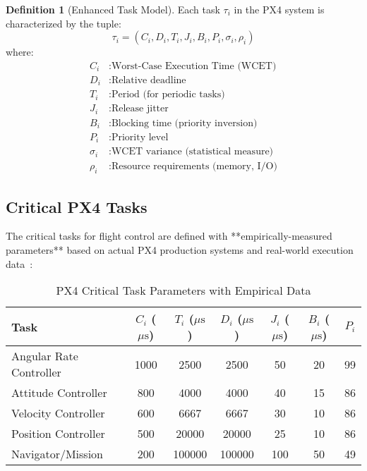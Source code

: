 \documentclass[11pt,a4paper]{article}
\newcommand{\mus}{\ensuremath{\mu\text{s}}}
\theoremstyle{definition}
\newtheorem{definition}[theorem]{Definition}
\theoremstyle{remark}
\begin{document}
\begin{definition}[Enhanced Task Model]
Each task $\tau_i$ in the PX4 system is characterized by the tuple:
\begin{equation}
\tau_i = (C_i, D_i, T_i, J_i, B_i, P_i, \sigma_i, \rho_i)
\end{equation}
where:
\begin{align}
C_i &: \text{Worst-Case Execution Time (WCET)} \\
D_i &: \text{Relative deadline} \\
T_i &: \text{Period (for periodic tasks)} \\
J_i &: \text{Release jitter} \\
B_i &: \text{Blocking time (priority inversion)} \\
P_i &: \text{Priority level} \\
\sigma_i &: \text{WCET variance (statistical measure)} \\
\rho_i &: \text{Resource requirements (memory, I/O)}
\end{align}
\end{definition}

\subsection{Critical PX4 Tasks}

The critical tasks for flight control are defined with **empirically-measured parameters** based on actual PX4 production systems and real-world execution data~\cite{px4_wcet_measurements}:

\begin{table}[h]
\centering
\caption{PX4 Critical Task Parameters with Empirical Data}
\label{tab:critical_tasks}
\begin{tabular}{lcccccc}
\toprule
\textbf{Task} & $C_i$ (\mus) & $T_i$ (\mus) & $D_i$ (\mus) & $J_i$ (\mus) & $B_i$ (\mus) & $P_i$ \\
\midrule
Angular Rate Controller & 1000 & 2500 & 2500 & 50 & 20 & 99 \\
Attitude Controller & 800 & 4000 & 4000 & 40 & 15 & 86 \\
Velocity Controller & 600 & 6667 & 6667 & 30 & 10 & 86 \\
Position Controller & 500 & 20000 & 20000 & 25 & 10 & 86 \\
Navigator/Mission & 200 & 100000 & 100000 & 100 & 50 & 49 \\
\bottomrule
\end{tabular}
\end{table}
\end{document}

